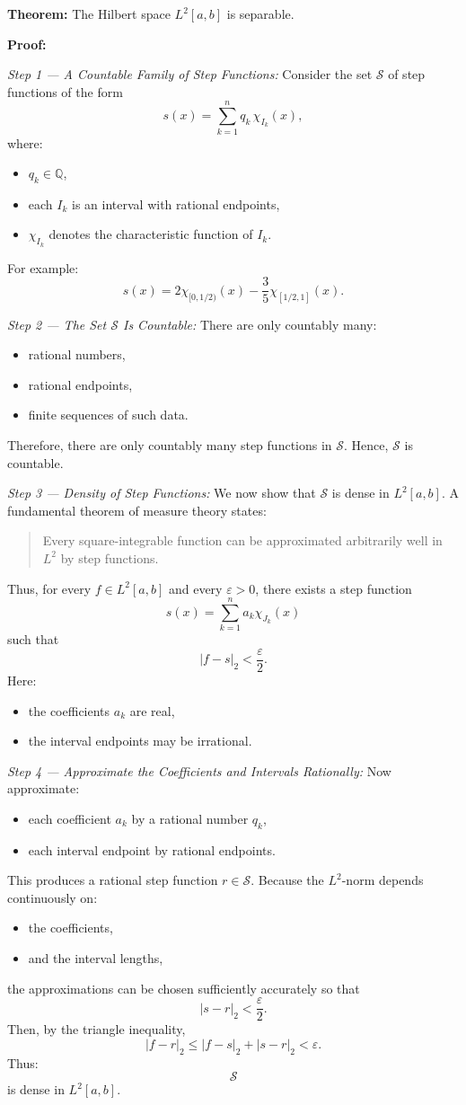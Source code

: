 \documentclass[aps,prl,twocolumn,groupedaddress]{revtex4-2}
\begin{document}
{\bf Theorem:}
The Hilbert space
$L^2[a,b]$
is separable.

{\bf Proof:}

{\em Step 1 — A Countable Family of Step Functions:}
Consider the set $\mathcal S$ of step functions of the form
$$
s(x)
=
\sum_{k=1}^n q_k\,\chi_{I_k}(x),
$$
where:
\begin{itemize}
\item $q_k\in\mathbb Q$,
\item each $I_k$ is an interval with rational endpoints,
\item $\chi_{I_k}$ denotes the characteristic function of $I_k$.
\end{itemize}
For example:
$$
s(x)
=
2\chi_{[0,1/2)}(x)
-
\frac{3}{5}
\chi_{[1/2,1]}(x).
$$

{\em Step 2 — The Set $\mathcal S$ Is Countable:}
There are only countably many:
\begin{itemize}
\item rational numbers,
\item rational endpoints,
\item finite sequences of such data.
\end{itemize}
Therefore, there are only countably many step functions in $\mathcal S$.
Hence, $\mathcal S$ is countable.

{\em Step 3 — Density of Step Functions:}
We now show that $\mathcal S$ is dense in $L^2[a,b]$.
A fundamental theorem of measure theory states:
\begin{quotation}
Every square-integrable function can be approximated arbitrarily well in $L^2$ by step functions.
\end{quotation}
Thus, for every $f\in L^2[a,b]$ and every $\varepsilon>0$, there exists a step function
$$
s(x)=\sum_{k=1}^n a_k\chi_{J_k}(x)
$$
such that
$$
|f-s|_2<\frac\varepsilon 2.
$$
Here:
\begin{itemize}
\item the coefficients $a_k$ are real,
\item the interval endpoints may be irrational.
\end{itemize}

{\em Step 4 — Approximate the Coefficients and Intervals Rationally:}
Now approximate:
\begin{itemize}
\item each coefficient $a_k$ by a rational number $q_k$,
\item each interval endpoint by rational endpoints.
\end{itemize}
This produces a rational step function $r\in\mathcal S$.
Because the $L^2$-norm depends continuously on:
\begin{itemize}
\item the coefficients,
\item and the interval lengths,
\end{itemize}
the approximations can be chosen sufficiently accurately so that
$$
|s-r|_2<\frac\varepsilon2.
$$
Then, by the triangle inequality,
$$
|f-r|_2
\le
|f-s|_2+|s-r|_2
<
\varepsilon.
$$
Thus:
$$
\mathcal S
$$
is dense in $L^2[a,b]$.
\end{document}
